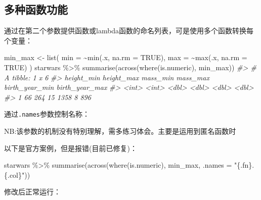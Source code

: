 \documentclass[
]{book}
\newenvironment{Shaded}{\begin{snugshade}}{\end{snugshade}}
\newcommand{\AttributeTok}[1]{\textcolor[rgb]{0.77,0.63,0.00}{#1}}
\newcommand{\CommentTok}[1]{\textcolor[rgb]{0.56,0.35,0.01}{\textit{#1}}}
\newcommand{\ConstantTok}[1]{\textcolor[rgb]{0.00,0.00,0.00}{#1}}
\newcommand{\FunctionTok}[1]{\textcolor[rgb]{0.00,0.00,0.00}{#1}}
\newcommand{\NormalTok}[1]{#1}
\newcommand{\OtherTok}[1]{\textcolor[rgb]{0.56,0.35,0.01}{#1}}
\newcommand{\SpecialCharTok}[1]{\textcolor[rgb]{0.00,0.00,0.00}{#1}}
\newcommand{\StringTok}[1]{\textcolor[rgb]{0.31,0.60,0.02}{#1}}
\begin{document}
\hypertarget{ux591aux79cdux51fdux6570ux529fux80fd}{%
\subsection{多种函数功能}\label{ux591aux79cdux51fdux6570ux529fux80fd}}

通过在第二个参数提供函数或lambda函数的命名列表，可是使用多个函数转换每个变量：

\begin{Shaded}
\begin{Highlighting}[]
\NormalTok{min\_max }\OtherTok{\textless{}{-}} \FunctionTok{list}\NormalTok{(}
  \AttributeTok{min =} \SpecialCharTok{\textasciitilde{}}\FunctionTok{min}\NormalTok{(.x, }\AttributeTok{na.rm =} \ConstantTok{TRUE}\NormalTok{), }
  \AttributeTok{max =} \SpecialCharTok{\textasciitilde{}}\FunctionTok{max}\NormalTok{(.x, }\AttributeTok{na.rm =} \ConstantTok{TRUE}\NormalTok{)}
\NormalTok{)}
\NormalTok{starwars }\SpecialCharTok{\%\textgreater{}\%} \FunctionTok{summarise}\NormalTok{(}\FunctionTok{across}\NormalTok{(}\FunctionTok{where}\NormalTok{(is.numeric), min\_max))}
\CommentTok{\#\textgreater{} \# A tibble: 1 x 6}
\CommentTok{\#\textgreater{}   height\_min height\_max mass\_min mass\_max birth\_year\_min birth\_year\_max}
\CommentTok{\#\textgreater{}        \textless{}int\textgreater{}      \textless{}int\textgreater{}    \textless{}dbl\textgreater{}    \textless{}dbl\textgreater{}          \textless{}dbl\textgreater{}          \textless{}dbl\textgreater{}}
\CommentTok{\#\textgreater{} 1         66        264       15     1358              8            896}
\end{Highlighting}
\end{Shaded}

通过\texttt{.names}参数控制名称：

NB:该参数的机制没有特别理解，需多练习体会。主要是运用到匿名函数时

以下是官方案例，但是报错(目前已修复)：

\begin{Shaded}
\begin{Highlighting}[]
\NormalTok{starwars }\SpecialCharTok{\%\textgreater{}\%} \FunctionTok{summarise}\NormalTok{(}\FunctionTok{across}\NormalTok{(}\FunctionTok{where}\NormalTok{(is.numeric), min\_max, }\AttributeTok{.names =} \StringTok{"\{.fn\}.\{.col\}"}\NormalTok{))}
\end{Highlighting}
\end{Shaded}

修改后正常运行：
\end{document}
